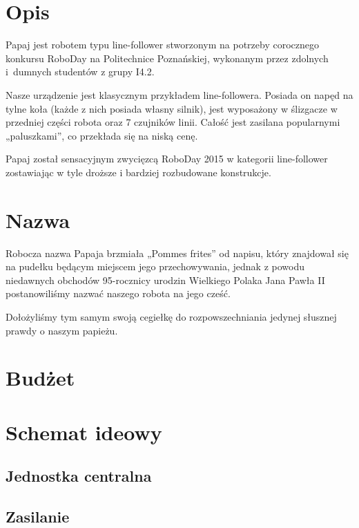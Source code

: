 \documentclass{article}
\begin{document}

\tableofcontents
\newpage

\section{Opis}

Papaj jest robotem typu line-follower stworzonym na potrzeby corocznego konkursu RoboDay na Politechnice Poznańskiej, wykonanym przez zdolnych i~dumnych studentów z grupy I4.2. 

Nasze urządzenie jest klasycznym przykładem line-followera. Posiada on napęd na tylne koła (każde z nich posiada własny silnik), jest wyposażony w ślizgacze w przedniej części robota oraz 7 czujników linii. Całość jest zasilana popularnymi „paluszkami”, co przekłada się na niską cenę.

Papaj został sensacyjnym zwycięzcą RoboDay 2015 w kategorii line-follower zostawiając w tyle droższe i bardziej rozbudowane konstrukcje.

\section{Nazwa}
				
Robocza nazwa Papaja brzmiała „Pommes frites” od napisu, który znajdował się na pudełku będącym miejscem jego przechowywania, jednak z powodu niedawnych obchodów 95-rocznicy urodzin Wielkiego Polaka Jana Pawła II postanowiliśmy nazwać naszego robota na jego cześć.

Dołożyliśmy tym samym swoją cegiełkę do rozpowszechniania jedynej słusznej prawdy o naszym papieżu. 
						
\section{Budżet}


\section{Schemat ideowy}

\subsection{Jednostka centralna}


\subsection{Zasilanie}

\end{document}
